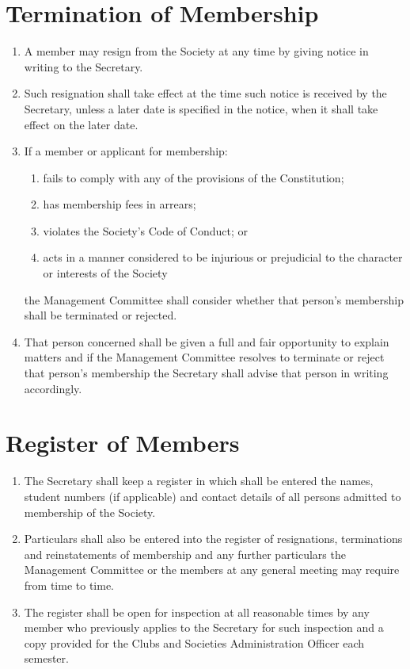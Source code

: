 \documentclass[a4paper]{article}
\newcommand*{\sectionr}[1]{{\raggedright \section{#1}}}
\begin{document}
\sectionr{Termination of Membership}
\begin{enumerate}
\item A member may resign from the Society at any time by giving notice in writing to the Secretary.
\item Such resignation shall take effect at the time such notice is received by the Secretary, unless a later date is specified in the notice, when it shall take effect on the later date.
\item If a member or applicant for membership:
	\begin{enumerate}
	\item fails to comply with any of the provisions of the Constitution;
	\item has membership fees in arrears;
	\item violates the Society's Code of Conduct; or
	\item acts in a manner considered to be injurious or prejudicial to the character or interests of the Society
	\end{enumerate}
the Management Committee shall consider whether that person's membership shall be terminated or rejected.
\item That person concerned shall be given a full and fair opportunity to explain matters and if the Management Committee resolves to terminate or reject that person's membership the Secretary shall advise that person in writing accordingly.
\end{enumerate}

\sectionr{Register of Members}
\begin{enumerate}
\item The Secretary shall keep a register in which shall be entered the names, student numbers (if applicable) and contact details of all persons admitted to membership of the Society.
\item Particulars shall also be entered into the register of resignations, terminations and reinstatements of membership and any further particulars the Management Committee or the members at any general meeting may require from time to time.
\item The register shall be open for inspection at all reasonable times by any member who previously applies to the Secretary for such inspection and a copy provided for the Clubs and Societies Administration Officer each semester.
\end{enumerate}
\end{document}

